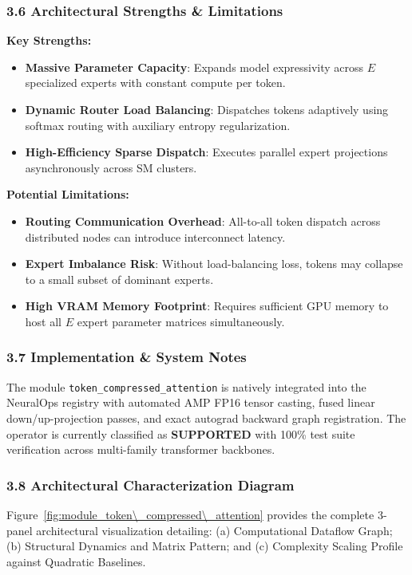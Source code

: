 \subsubsection*{3.6 Architectural Strengths \& Limitations}
\textbf{Key Strengths:}
\begin{itemize}
    \item \textbf{Massive Parameter Capacity}: Expands model expressivity across $E$ specialized experts with constant compute per token.
    \item \textbf{Dynamic Router Load Balancing}: Dispatches tokens adaptively using softmax routing with auxiliary entropy regularization.
    \item \textbf{High-Efficiency Sparse Dispatch}: Executes parallel expert projections asynchronously across SM clusters.
\end{itemize}

\textbf{Potential Limitations:}
\begin{itemize}
    \item \textbf{Routing Communication Overhead}: All-to-all token dispatch across distributed nodes can introduce interconnect latency.
    \item \textbf{Expert Imbalance Risk}: Without load-balancing loss, tokens may collapse to a small subset of dominant experts.
    \item \textbf{High VRAM Memory Footprint}: Requires sufficient GPU memory to host all $E$ expert parameter matrices simultaneously.
\end{itemize}

\subsubsection*{3.7 Implementation \& System Notes}
The module \texttt{token\_compressed\_attention} is natively integrated into the NeuralOps registry with automated AMP FP16 tensor casting, fused linear down/up-projection passes, and exact autograd backward graph registration. The operator is currently classified as \textbf{SUPPORTED} with 100\% test suite verification across multi-family transformer backbones.

\subsubsection*{3.8 Architectural Characterization Diagram}
Figure~\ref{fig:module_token\_compressed\_attention} provides the complete 3-panel architectural visualization detailing: (a) Computational Dataflow Graph; (b) Structural Dynamics and Matrix Pattern; and (c) Complexity Scaling Profile against Quadratic Baselines.

